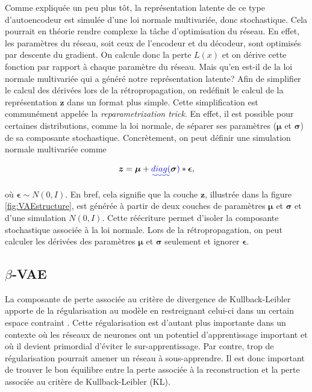 Comme expliquée un peu plus tôt, la représentation latente de ce type d'autoencodeur est simulée d'une loi normale multivariée, donc stochastique. Cela pourrait en théorie rendre complexe la tâche d'optimisation du réseau. En effet, les paramètres du réseau, soit ceux de l'encodeur et du décodeur, sont optimisés par descente du gradient. On calcule donc la perte $L(x)$ et on dérive cette fonction par rapport à chaque paramètre du réseau. Mais qu'en est-il de la loi normale multivariée qui a généré notre représentation latente? Afin de simplifier le calcul des dérivées lors de la rétropropagation, on redéfinit le calcul de la représentation $\boldsymbol{z}$ dans un format plus simple. Cette simplification est communément appelée la  \textit{reparametrization trick}. En effet, il est possible pour certaines distributions, comme la loi normale, de séparer ses paramètres ($\boldsymbol{\mu}$ et $\boldsymbol{\sigma}$)  de sa composante stochastique. Concrètement, on peut définir une simulation normale multivariée comme

\begin{equation} \label{eq:latent_formula}
\boldsymbol{z} = \boldsymbol{\mu} + \DIFaddbegin \DIFadd{diag(}\DIFaddend \boldsymbol{\sigma}\DIFaddbegin \DIFadd{) }\DIFaddend *\boldsymbol{\epsilon},
\end{equation}

où $\boldsymbol{\epsilon} \sim N(0,I)$. En bref, cela signifie que la couche $\boldsymbol{z}$, illustrée dans la figure \ref{fig:VAEstructure}, est générée à partir de deux couches de paramètres $\boldsymbol{\mu}$ et $\boldsymbol{\sigma}$ et d'une simulation $N(0,I)$. Cette réécriture permet d'isoler la composante stochastique associée à la loi normale. Lors de la rétropropagation, on peut calculer les dérivées des paramètres $\boldsymbol{\mu}$ et $\boldsymbol{\sigma}$ seulement et ignorer $\boldsymbol{\epsilon}$. 

\subsection{$\beta$-VAE} \label{beta-vae}

La composante de perte associée au critère de divergence de Kullback-Leibler apporte de la régularisation au modèle en restreignant celui-ci dans un certain espace contraint \citep{kingma2013autoencoding}. Cette régularisation est d'autant plus importante dans un contexte où les réseaux de neurones ont un potentiel d'apprentissage important et où il devient primordial d'éviter le sur-apprentissage. Par contre, trop de régularisation pourrait amener un réseau à sous-apprendre. Il est donc important de trouver le bon équilibre entre la perte associée à la reconstruction et la perte associée au critère de Kullback-Leibler (KL).

